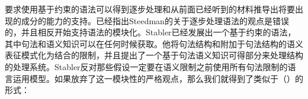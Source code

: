 
要求使用基于约束的语法可以得到逐步处理和从前面已经听到的材料推导出将要出现的成分的能力的支持。\cite{Stabler91a}已经指出Steedman的关于逐步处理语法的观点是错误的，并且相反开始支持语法的模块化。Stabler已经发展出一个基于约束的语法，其中句法和语义知识可以在任何时候获取。他将句法结构和附加于句法结构的语义表征模式化为结合的限制，并且提出了一个基于句法语义知识可得部分来处理结构的处理系统。Stabler反对那些假设一定要在语义限制之前使用所有句法限制的语言运用模型。如果放弃了这一模块性的严格观点，那么我们就得到了类似于（）的形式：

